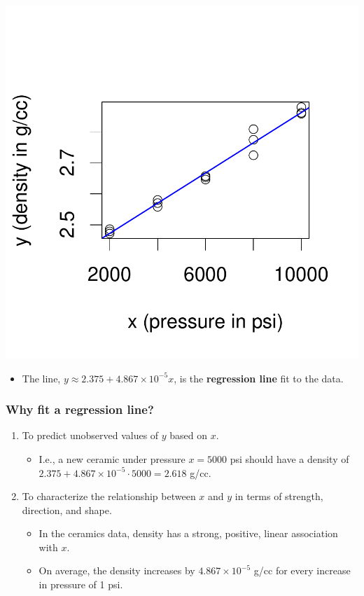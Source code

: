 \documentclass[handout]{beamer}
\numberwithin{equation}{section}
\begin{document}
\begin{frame}
\frametitle{}
\vspace{-3em}
\begin{center}
\includegraphics{ch4part1-004}
\end{center}

\begin{itemize}
\item The line,  $y \approx 2.375 + 4.867 \times 10^{-5} x$, is the {\bf regression line} fit to the data.
\end{itemize}
\end{frame}

\begin{frame}
\frametitle{Why fit a regression line?}
\begin{enumerate}[1. ]
\pause \item To predict unobserved values of $y$ based on $x$.
\begin{itemize}
\pause \item I.e., a new ceramic under pressure $x = 5000$ psi should have a density of $2.375 + 4.867 \times 10^{-5} \cdot 5000 = 2.618$ g/cc.
\end{itemize}
\pause \item To characterize the relationship between $x$ and $y$ in terms of strength, direction, and shape.
\begin{itemize}
\pause \item In the ceramics data, density has a strong, positive, linear association with $x$.
\pause \item On average, the density increases by $4.867 \times 10^{-5}$ g/cc for every increase in pressure of 1 psi.
\end{itemize}
\end{enumerate}
\end{frame}
\end{document}
